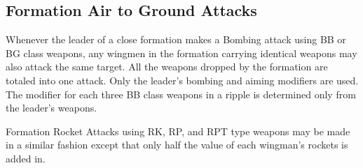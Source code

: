 \begin{advancedrules}
\subsection{Formation Air to Ground Attacks} Whenever the leader of a close formation makes a Bombing attack using BB or BG class weapons, any wingmen in the formation carrying identical weapons may also attack the same target. All the weapons dropped by the formation are totaled into one attack. Only the leader's bombing and aiming modifiers are used. The modifier for each three BB class weapons in a ripple is determined only from the leader's weapons.

Formation Rocket Attacks using RK, RP, and RPT type weapons may be made in a similar fashion except that only half the value of each wingman's rockets is added in.

\end{advancedrules}